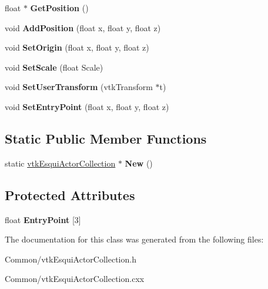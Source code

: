 \begin{DoxyCompactItemize}
\item 
\hypertarget{classvtkEsquiActorCollection_a124decd7e6bfbd27c09e3ef5fe3c340a}{
float $\ast$ {\bfseries GetPosition} ()}
\label{classvtkEsquiActorCollection_a124decd7e6bfbd27c09e3ef5fe3c340a}

\item 
\hypertarget{classvtkEsquiActorCollection_ab5a17dd1f5a3a1cf818639875e3a9548}{
void {\bfseries AddPosition} (float x, float y, float z)}
\label{classvtkEsquiActorCollection_ab5a17dd1f5a3a1cf818639875e3a9548}

\item 
\hypertarget{classvtkEsquiActorCollection_ac352f465aa518e4b3f177c46cf5dec00}{
void {\bfseries SetOrigin} (float x, float y, float z)}
\label{classvtkEsquiActorCollection_ac352f465aa518e4b3f177c46cf5dec00}

\item 
\hypertarget{classvtkEsquiActorCollection_a263fbd6d594ca922c6652f86c014c3de}{
void {\bfseries SetScale} (float Scale)}
\label{classvtkEsquiActorCollection_a263fbd6d594ca922c6652f86c014c3de}

\item 
\hypertarget{classvtkEsquiActorCollection_ac8d2a1189a0e1f3f2326f2751967445f}{
void {\bfseries SetUserTransform} (vtkTransform $\ast$t)}
\label{classvtkEsquiActorCollection_ac8d2a1189a0e1f3f2326f2751967445f}

\item 
\hypertarget{classvtkEsquiActorCollection_a0c03b66e8317c2d782540976557f868d}{
void {\bfseries SetEntryPoint} (float x, float y, float z)}
\label{classvtkEsquiActorCollection_a0c03b66e8317c2d782540976557f868d}

\end{DoxyCompactItemize}
\subsection*{Static Public Member Functions}
\begin{DoxyCompactItemize}
\item 
\hypertarget{classvtkEsquiActorCollection_afcdc8a605f2bfd0a8287272b4765739d}{
static \hyperlink{classvtkEsquiActorCollection}{vtkEsquiActorCollection} $\ast$ {\bfseries New} ()}
\label{classvtkEsquiActorCollection_afcdc8a605f2bfd0a8287272b4765739d}

\end{DoxyCompactItemize}
\subsection*{Protected Attributes}
\begin{DoxyCompactItemize}
\item 
\hypertarget{classvtkEsquiActorCollection_a3d96751507979b91effbd03886cb5a28}{
float {\bfseries EntryPoint} \mbox{[}3\mbox{]}}
\label{classvtkEsquiActorCollection_a3d96751507979b91effbd03886cb5a28}

\end{DoxyCompactItemize}


The documentation for this class was generated from the following files:\begin{DoxyCompactItemize}
\item 
Common/vtkEsquiActorCollection.h\item 
Common/vtkEsquiActorCollection.cxx\end{DoxyCompactItemize}
